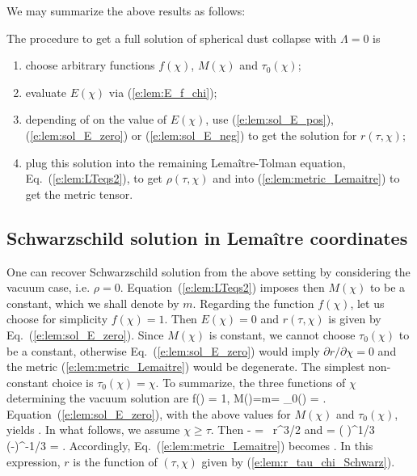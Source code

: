 We may summarize the above results as follows:
\begin{greybox}
The procedure to get a full solution of spherical dust collapse with $\Lambda=0$ is
\begin{enumerate}
\item choose arbitrary functions
$f(\chi)$, $M(\chi)$ and $\tau_0(\chi)$;
\item evaluate $E(\chi)$ via (\ref{e:lem:E_f_chi});
\item depending of
on the value of $E(\chi)$, use (\ref{e:lem:sol_E_pos}), (\ref{e:lem:sol_E_zero})
or (\ref{e:lem:sol_E_neg}) to get the solution for $r(\tau,\chi)$;
\item plug this solution into the remaining Lemaître-Tolman equation,
Eq.~(\ref{e:lem:LTeqs2}), to get $\rho(\tau,\chi)$ and into
(\ref{e:lem:metric_Lemaitre}) to get the metric tensor.
\end{enumerate}
\end{greybox}

\subsection{Schwarzschild solution in Lemaître coordinates} \label{s:lem:Schwarzschild}

One can recover Schwarzschild solution from the above setting by
considering the vacuum case, i.e. $\rho=0$.
Equation~(\ref{e:lem:LTeqs2}) imposes then $M(\chi)$ to be a constant, which
we shall denote by $m$. Regarding the function $f(\chi)$, let us
choose for simplicity $f(\chi)=1$. Then $E(\chi)=0$ and $r(\tau,\chi)$
is given by Eq.~(\ref{e:lem:sol_E_zero}). Since $M(\chi)$ is constant, we
cannot choose $\tau_0(\chi)$ to be a constant, otherwise Eq.~(\ref{e:lem:sol_E_zero})
would imply $\partial r/\partial \chi=0$ and the metric
(\ref{e:lem:metric_Lemaitre}) would be degenerate.
The simplest non-constant choice is
$\tau_0(\chi) = \chi$. To summarize, the
three functions of $\chi$ determining the vacuum solution are
\be
    f(\chi) = 1, \qquad M(\chi)=m= \qand \tau_0(\chi) = \chi .
\ee
Equation~(\ref{e:lem:sol_E_zero}), with the above values for $M(\chi)$ and $\tau_0(\chi)$,
yields
\be \label{e:lem:r_tau_chi_Schwarz}
    .
\ee
In what follows, we assume $\chi\geq\tau$. Then
\be \label{e:lem:chi_tau_r_Schwarz}
    \chi - \tau =  \,  r^{3/2}
\ee
and
\be \label{e:lem:drdchi_Schwarz}
     = \left(  \right)^{1/3} (\chi-\tau)^{-1/3}
        =  .
\ee
Accordingly, Eq.~(\ref{e:lem:metric_Lemaitre}) becomes
\be \label{e:lem:Sch_met_Lem}
     .
\ee
In this expression, $r$ is the function of $(\tau,\chi)$ given
by (\ref{e:lem:r_tau_chi_Schwarz}).

